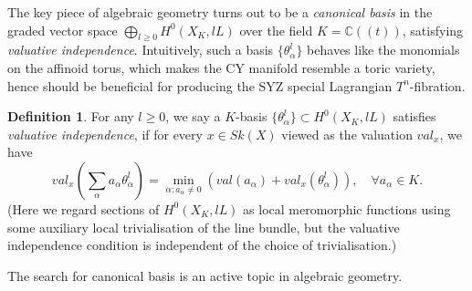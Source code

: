 \documentclass[a4paper]{article}
\theoremstyle{definition}
\newtheorem{Def}[thm]{Definition}
\newtheorem{Question}{Question}
\newcommand{\C}{\mathbb{C}}
\begin{document}
	

	
	
	
	
	The key piece of algebraic geometry turns out to be a \emph{canonical basis} in the graded vector space  $\bigoplus_{l\geq 0} H^0(X_K, lL)$ over the field $K=\C(\!(t)\!)$, satisfying \emph{valuative independence}. Intuitively, such  a basis $\{ \theta_\alpha^l\}$ behaves like the monomials on the affinoid torus, which makes the CY manifold resemble a toric variety, hence should be beneficial for producing the SYZ special Lagrangian $T^n$-fibration. 
	
	
	
	
	
	
		
	\begin{Def}\label{Def:valuativeindependence}
For any $l\geq 0$,  we say a $K$-basis  $\{ \theta_\alpha^l \}  \subset H^0(X_K, lL)$  satisfies \emph{valuative independence}, if for every $x\in Sk(X)$ viewed as the valuation $val_x$, we have 
		\[
		val_x(\sum_\alpha a_\alpha \theta^l_\alpha)= \min_{\alpha: a_\alpha\neq 0}  (val(a_\alpha) + val_x(\theta^l_\alpha) ),\quad \forall a_\alpha\in K.
		\]
		(Here we regard sections of $H^0( X_K, lL )$ as local meromorphic functions using some auxiliary local trivialisation of the line bundle, but the valuative independence condition is independent of the choice of trivialisation.)
		
		
		
	\end{Def}
	
	
	
	
The search for canonical basis is an active  topic in algebraic geometry.
\end{document}
